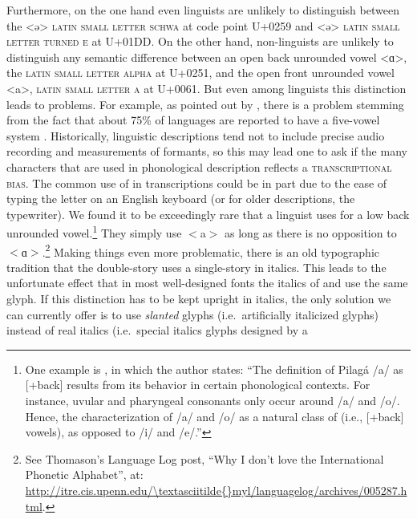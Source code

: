 Furthermore, on the one hand even linguists are unlikely to distinguish between
the <ə> \textsc{latin small letter schwa} at code point U+0259 and <ǝ>
\textsc{latin small letter turned e} at U+01DD. On the other hand, non-linguists
are unlikely to distinguish any semantic difference between an open back
unrounded vowel <ɑ>, the \textsc{latin small letter alpha} at U+0251, and the
open front unrounded vowel <a>, \textsc{latin small letter a} at U+0061. But
even among linguists this distinction leads to problems. For example, as pointed
out by \citet{Mielke2009}, there is a problem stemming from the fact that about
75\% of languages are reported to have a five-vowel system
\citep{Maddieson1984}. Historically, linguistic descriptions tend not to include
precise audio recording and measurements of formants, so this may lead one to
ask if the many characters that are used in phonological description reflects a
\textsc{transcriptional bias}. The common use of in transcriptions could be in
part due to the ease of typing the letter on an English keyboard (or for older
descriptions, the typewriter). We found it to be exceedingly rare that a
linguist uses for a low back unrounded vowel.\footnote{One example is
\citet[75]{Vidal2001a}, in which the author states: ``The definition of Pilagá
/a/ as {[}+back{]} results from its behavior in certain phonological contexts.
For instance, uvular and pharyngeal consonants only occur around /a/ and /o/.
Hence, the characterization of /a/ and /o/ as a natural class of (i.e.,
{[}+back{]} vowels), as opposed to /i/ and /e/.''} They simply use $<$a$>$ as
long as there is no opposition to $<$ɑ$>$.\footnote{See Thomason's Language Log
post, ``Why I don't love the International Phonetic Alphabet'', at:
\url{http://itre.cis.upenn.edu/\textasciitilde{}myl/languagelog/archives/005287.html}.}
Making things even more problematic, there is an old typographic tradition that
the double-story uses a single-story in italics. This leads to the unfortunate
effect that in most well-designed fonts the italics of and use the same glyph.
If this distinction has to be kept upright in italics, the only solution we can
currently offer is to use \textit{slanted} glyphs (i.e.~artificially italicized
glyphs) instead of real italics (i.e.~special italics glyphs designed by a
